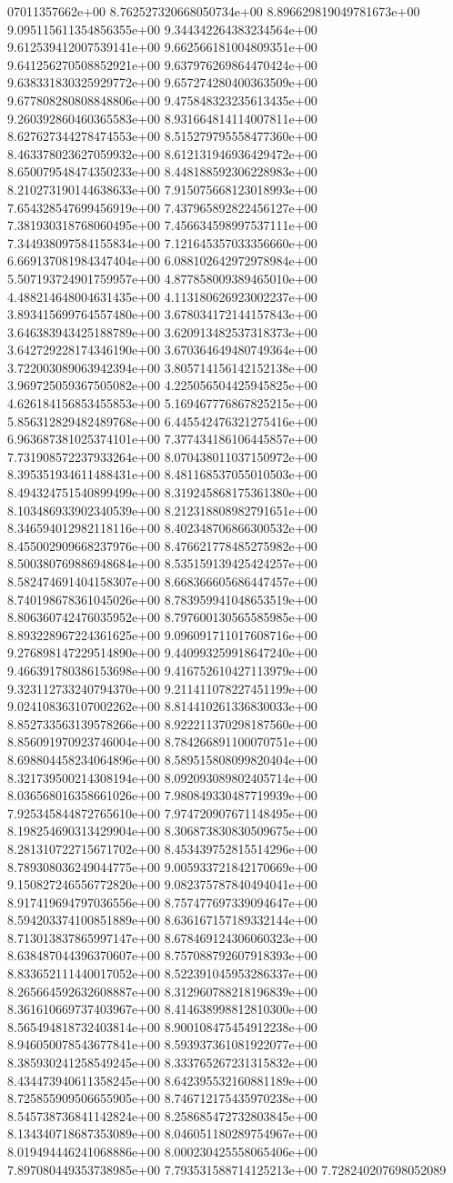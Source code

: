 07011357662e+00	8.762527320668050734e+00	8.896629819049781673e+00	9.095115611354856355e+00	9.344342264383234564e+00	9.612539412007539141e+00	9.662566181004809351e+00	9.641256270508852921e+00	9.637976269864470424e+00	9.638331830325929772e+00	9.657274280400363509e+00	9.677808280808848806e+00	9.475848323235613435e+00	9.260392860460365583e+00	8.931664814114007811e+00	8.627627344278474553e+00	8.515279795558477360e+00	8.463378023627059932e+00	8.612131946936429472e+00	8.650079548474350233e+00	8.448188592306228983e+00	8.210273190144638633e+00	7.915075668123018993e+00	7.654328547699456919e+00	7.437965892822456127e+00	7.381930318768060495e+00	7.456634598997537111e+00	7.344938097584155834e+00	7.121645357033356660e+00	6.669137081984347404e+00	6.088102642972978984e+00	5.507193724901759957e+00	4.877858009389465010e+00	4.488214648004631435e+00	4.113180626923002237e+00	3.893415699764557480e+00	3.678034172144157843e+00	3.646383943425188789e+00	3.620913482537318373e+00	3.642729228174346190e+00	3.670364649480749364e+00	3.722003089063942394e+00	3.805714156142152138e+00	3.969725059367505082e+00	4.225056504425945825e+00	4.626184156853455853e+00	5.169467776867825215e+00	5.856312829482489768e+00	6.445542476321275416e+00	6.963687381025374101e+00	7.377434186106445857e+00	7.731908572237933264e+00	8.070438011037150972e+00	8.395351934611488431e+00	8.481168537055010503e+00	8.494324751540899499e+00	8.319245868175361380e+00	8.103486933902340539e+00	8.212318808982791651e+00	8.346594012982118116e+00	8.402348706866300532e+00	8.455002909668237976e+00	8.476621778485275982e+00	8.500380769886948684e+00	8.535159139425424257e+00	8.582474691404158307e+00	8.668366605686447457e+00	8.740198678361045026e+00	8.783959941048653519e+00	8.806360742476035952e+00	8.797600130565585985e+00	8.893228967224361625e+00	9.096091711017608716e+00	9.276898147229514890e+00	9.440993259918647240e+00	9.466391780386153698e+00	9.416752610427113979e+00	9.323112733240794370e+00	9.211411078227451199e+00	9.024108363107002262e+00	8.814410261336830033e+00	8.852733563139578266e+00	8.922211370298187560e+00	8.856091970923746004e+00	8.784266891100070751e+00	8.698804458234064896e+00	8.589515808099820404e+00	8.321739500214308194e+00	8.092093089802405714e+00	8.036568016358661026e+00	7.980849330487719939e+00	7.925345844872765610e+00	7.974720907671148495e+00	8.198254690313429904e+00	8.306873830830509675e+00	8.281310722715671702e+00	8.453439752815514296e+00	8.789308036249044775e+00	9.005933721842170669e+00	9.150827246556772820e+00	9.082375787840494041e+00	8.917419694797036556e+00	8.757477697339094647e+00	8.594203374100851889e+00	8.636167157189332144e+00	8.713013837865997147e+00	8.678469124306060323e+00	8.638487044396370607e+00	8.757088792607918393e+00	8.833652111440017052e+00	8.522391045953286337e+00	8.265664592632608887e+00	8.312960788218196839e+00	8.361610669737403967e+00	8.414638998812810300e+00	8.565494818732403814e+00	8.900108475454912238e+00	8.946050078543677841e+00	8.593937361081922077e+00	8.385930241258549245e+00	8.333765267231315832e+00	8.434473940611358245e+00	8.642395532160881189e+00	8.725855909506655905e+00	8.746712175435970238e+00	8.545738736841142824e+00	8.258685472732803845e+00	8.134340718687353089e+00	8.046051180289754967e+00	8.019494446241068886e+00	8.000230425558065406e+00	7.897080449353738985e+00	7.793531588714125213e+00	7.728240207698052089